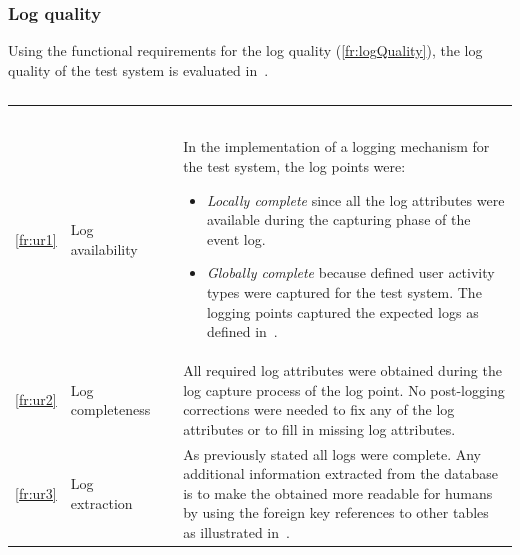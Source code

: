 \clearpage

\subsubsection{Log quality}
Using the functional requirements for the log quality (\ref{fr:logQuality}), the log quality of the test system is evaluated in~.

\begin{xltabular}{\textwidth}{clcX}
	\caption[Logging quality assessment of the test system]{\textit{Logging quality assessment of the test system}}\label{tbl:ch3_testLoggingQuality}\\
	\toprule
	 &  &  &  \\
	\midrule
	\endfirsthead

	\caption[]{\continueCaption} \\
	\toprule
	 &  &  &  \\
	\midrule
	\endhead

	\midrule
	 \\ 
	\endfoot
	\endlastfoot

	\ref{fr:ur1} & Log availability & \cmark & \RaggedRight In the implementation of a logging mechanism for the test system, the log points were:
		\begin{itemize}
			\item \textit{Locally complete} since all the log attributes were available during the capturing phase of the event log.
			\item \textit{Globally complete} because defined user activity types were captured for the test system. The logging points captured the expected logs as defined in~.
		\end{itemize} \\
	\ref{fr:ur2} & Log completeness & \cmark & All required log attributes were obtained during the log capture process of the log point. No post-logging corrections were needed to fix any of the log attributes or to fill in missing log attributes. \\
	\ref{fr:ur3} & Log extraction & \cmark & As previously stated all logs were complete. Any additional information extracted from the database is to make the obtained more readable for humans by using the foreign key references to other tables as illustrated in~. \\
	\bottomrule
\end{xltabular}

